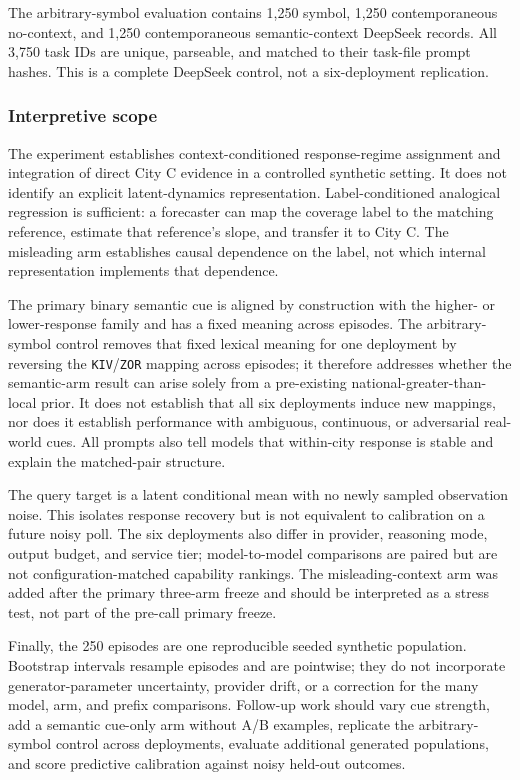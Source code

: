 The arbitrary-symbol evaluation contains 1,250 symbol, 1,250 contemporaneous
no-context, and 1,250 contemporaneous semantic-context DeepSeek records. All
3,750 task IDs are unique, parseable, and matched to their task-file prompt
hashes. This is a complete DeepSeek control, not a six-deployment replication.

\subsubsection{Interpretive scope}
The experiment establishes context-conditioned response-regime assignment and
integration of direct City C evidence in a controlled synthetic setting. It does
not identify an explicit latent-dynamics representation. Label-conditioned
analogical regression is sufficient: a forecaster can map the coverage label to
the matching reference, estimate that reference's slope, and transfer it to City
C. The misleading arm establishes causal dependence on the label, not which
internal representation implements that dependence.

The primary binary semantic cue is aligned by construction with the higher- or
lower-response family and has a fixed meaning across episodes. The arbitrary-symbol
control removes that fixed lexical meaning for one deployment by reversing the
\texttt{KIV}/\texttt{ZOR} mapping across episodes; it therefore addresses whether
the semantic-arm result can arise solely from a pre-existing
national-greater-than-local prior. It does not establish that all six deployments
induce new mappings, nor does it establish performance with ambiguous,
continuous, or adversarial real-world cues. All prompts also tell models that
within-city response is stable and explain the matched-pair structure.

The query target is a latent conditional mean with no newly sampled observation
noise. This isolates response recovery but is not equivalent to calibration on a
future noisy poll. The six deployments also differ in provider, reasoning mode,
output budget, and service tier; model-to-model comparisons are paired but are not
configuration-matched capability rankings. The misleading-context arm was added
after the primary three-arm freeze and should be interpreted as a stress test,
not part of the pre-call primary freeze.

Finally, the 250 episodes are one reproducible seeded synthetic population.
Bootstrap intervals resample episodes and are pointwise; they do not incorporate
generator-parameter uncertainty, provider drift, or a correction for the many
model, arm, and prefix comparisons. Follow-up work should vary cue strength, add a
semantic cue-only arm without A/B examples, replicate the arbitrary-symbol control
across deployments, evaluate additional generated populations, and score predictive
calibration against noisy held-out outcomes.

